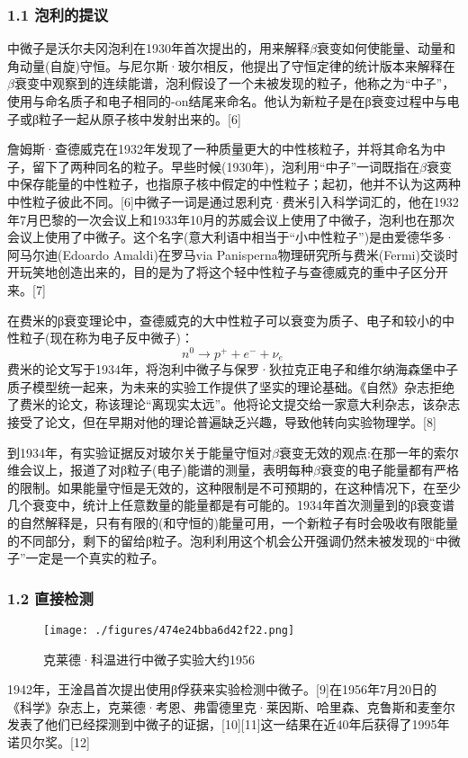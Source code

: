 \subsubsection{1.1 泡利的提议}
中微子是沃尔夫冈泡利在1930年首次提出的，用来解释$\beta$衰变如何使能量、动量和角动量(自旋)守恒。与尼尔斯·玻尔相反，他提出了守恒定律的统计版本来解释在$\beta$衰变中观察到的连续能谱，泡利假设了一个未被发现的粒子，他称之为“中子”，使用与命名质子和电子相同的-on结尾来命名。他认为新粒子是在β衰变过程中与电子或β粒子一起从原子核中发射出来的。[6]

詹姆斯·查德威克在1932年发现了一种质量更大的中性核粒子，并将其命名为中子，留下了两种同名的粒子。早些时候(1930年)，泡利用“中子”一词既指在$\beta$衰变中保存能量的中性粒子，也指原子核中假定的中性粒子；起初，他并不认为这两种中性粒子彼此不同。[6]中微子一词是通过恩利克·费米引入科学词汇的，他在1932年7月巴黎的一次会议上和1933年10月的苏威会议上使用了中微子，泡利也在那次会议上使用了中微子。这个名字(意大利语中相当于“小中性粒子”)是由爱德华多·阿马尔迪(Edoardo Amaldi)在罗马via Panisperna物理研究所与费米(Fermi)交谈时开玩笑地创造出来的，目的是为了将这个轻中性粒子与查德威克的重中子区分开来。[7]

在费米的β衰变理论中，查德威克的大中性粒子可以衰变为质子、电子和较小的中性粒子(现在称为电子反中微子)：
$$n^0 \to p^+ +e^- +\nu_e~$$
费米的论文写于1934年，将泡利中微子与保罗·狄拉克正电子和维尔纳海森堡中子质子模型统一起来，为未来的实验工作提供了坚实的理论基础。《自然》杂志拒绝了费米的论文，称该理论“离现实太远”。他将论文提交给一家意大利杂志，该杂志接受了论文，但在早期对他的理论普遍缺乏兴趣，导致他转向实验物理学。[8]

到1934年，有实验证据反对玻尔关于能量守恒对$\beta$衰变无效的观点:在那一年的索尔维会议上，报道了对β粒子(电子)能谱的测量，表明每种$\beta$衰变的电子能量都有严格的限制。如果能量守恒是无效的，这种限制是不可预期的，在这种情况下，在至少几个衰变中，统计上任意数量的能量都是有可能的。1934年首次测量到的β衰变谱的自然解释是，只有有限的(和守恒的)能量可用，一个新粒子有时会吸收有限能量的不同部分，剩下的留给β粒子。泡利利用这个机会公开强调仍然未被发现的“中微子”一定是一个真实的粒子。

\subsubsection{1.2 直接检测}
\begin{figure}[ht]
\centering
\texttt{[image: ./figures/474e24bba6d42f22.png]}
\caption{克莱德·科温进行中微子实验大约1956} \label{fig_ZWZ_1}
\end{figure}
1942年，王淦昌首次提出使用β俘获来实验检测中微子。[9]在1956年7月20日的《科学》杂志上，克莱德·考恩、弗雷德里克·莱因斯、哈里森、克鲁斯和麦奎尔发表了他们已经探测到中微子的证据，[10][11]这一结果在近40年后获得了1995年诺贝尔奖。[12]

